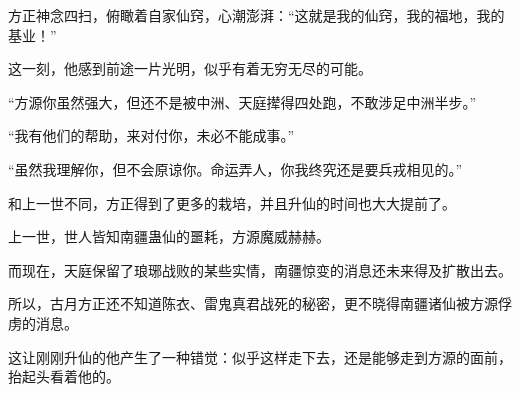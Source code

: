 \begin{this_body}
方正神念四扫，俯瞰着自家仙窍，心潮澎湃：“这就是我的仙窍，我的福地，我的基业！”

这一刻，他感到前途一片光明，似乎有着无穷无尽的可能。

“方源你虽然强大，但还不是被中洲、天庭撵得四处跑，不敢涉足中洲半步。”

“我有他们的帮助，来对付你，未必不能成事。”

“虽然我理解你，但不会原谅你。命运弄人，你我终究还是要兵戎相见的。”

和上一世不同，方正得到了更多的栽培，并且升仙的时间也大大提前了。

上一世，世人皆知南疆蛊仙的噩耗，方源魔威赫赫。

而现在，天庭保留了琅琊战败的某些实情，南疆惊变的消息还未来得及扩散出去。

所以，古月方正还不知道陈衣、雷鬼真君战死的秘密，更不晓得南疆诸仙被方源俘虏的消息。

这让刚刚升仙的他产生了一种错觉：似乎这样走下去，还是能够走到方源的面前，抬起头看着他的。

\end{this_body}

